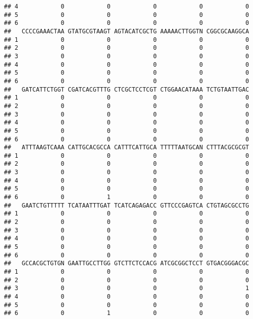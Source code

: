 \documentclass[]{article}
\begin{document}
\begin{verbatim}
## 4            0            0            0            0            0
## 5            0            0            0            0            0
## 6            0            0            0            0            0
##   CCCCGAAACTAA GTATGCGTAAGT AGTACATCGCTG AAAAACTTGGTN CGGCGCAAGGCA
## 1            0            0            0            0            0
## 2            0            0            0            0            0
## 3            0            0            0            0            0
## 4            0            0            0            0            0
## 5            0            0            0            0            0
## 6            0            0            0            0            0
##   GATCATTCTGGT CGATCACGTTTG CTCGCTCCTCGT CTGGAACATAAA TCTGTAATTGAC
## 1            0            0            0            0            0
## 2            0            0            0            0            0
## 3            0            0            0            0            0
## 4            0            0            0            0            0
## 5            0            0            0            0            0
## 6            0            0            0            0            0
##   ATTTAAGTCAAA CATTGCACGCCA CATTTCATTGCA TTTTTAATGCAN CTTTACGCGCGT
## 1            0            0            0            0            0
## 2            0            0            0            0            0
## 3            0            0            0            0            0
## 4            0            0            0            0            0
## 5            0            0            0            0            0
## 6            0            1            0            0            0
##   GAATCTGTTTTT TCATAATTTGAT TCATCAGAGACC GTTCCCGAGTCA CTGTAGCGCCTG
## 1            0            0            0            0            0
## 2            0            0            0            0            0
## 3            0            0            0            0            0
## 4            0            0            0            0            0
## 5            0            0            0            0            0
## 6            0            0            0            0            0
##   GCCACGCTGTGN GAATTGCCTTGG GTCTTCTCCACG ATCGCGGCTCCT GTGACGGGACGC
## 1            0            0            0            0            0
## 2            0            0            0            0            0
## 3            0            0            0            0            1
## 4            0            0            0            0            0
## 5            0            0            0            0            0
## 6            0            1            0            0            0

\end{verbatim}
\end{document}
